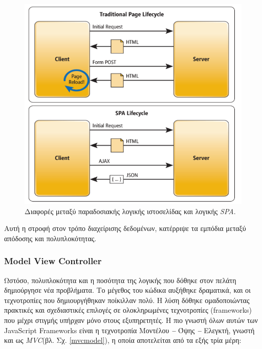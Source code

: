 \begin{figure}[ht]
	\includegraphics[scale=0.5]{figures/ajax-calls.png}
	\centering
	\caption{Διαφορές μεταξύ παραδοσιακής λογικής ιστοσελίδας και λογικής \textit{SPA}.}
	\label{ajaxcalls}
\end{figure}

Αυτή η στροφή στον τρόπο διαχείρισης δεδομένων, κατέρριψε τα εμπόδια μεταξύ απόδοσης και πολυπλοκότητας.

\subsubsection{Model View Controller}
Ωστόσο, πολυπλοκότητα και η ποσότητα της λογικής που δόθηκε στον πελάτη
δημιούργησε νέα προβλήματα. Το μέγεθος του κώδικα αυξήθηκε δραματικά, και οι τεχνοτροπίες που δημιουργήθηκαν ποίκιλλαν πολύ. H λύση δόθηκε ομαδοποιώντας πρακτικές και σχεδιαστικές επιλογές σε ολοκληρωμένες τεχνοτροπίες (frameworks) που μέχρι στιγμής υπήρχαν μόνο στους εξυπηρετητές. Η πιο γνωστή όλων
αυτών των JavaScript Frameworks είναι η τεχνοτροπία Μοντέλου \textit{\textbf{--}} Όψης \textit{\textbf{--}} Ελεγκτή, γνωστή και ως \textit{MVC}(βλ. Σχ. \ref{mvcmodel}), η οποία αποτελείται από τα εξής τρία μέρη:

